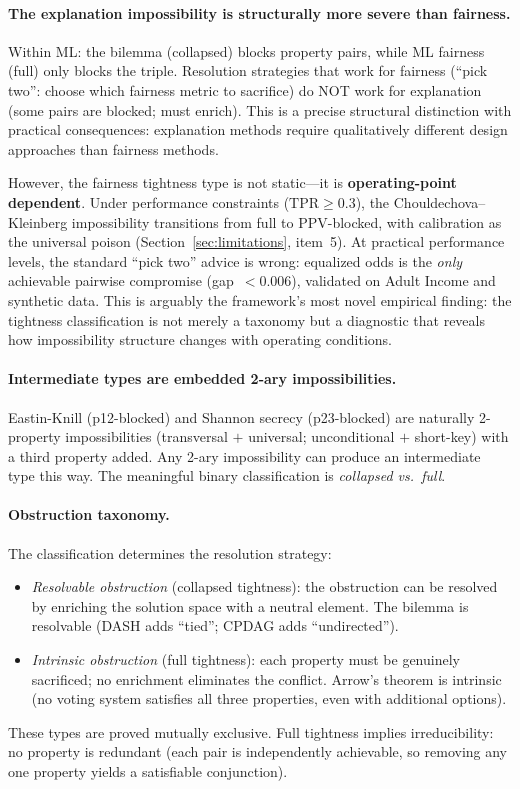 \documentclass[11pt,a4paper]{article}
\begin{document}
\paragraph{The explanation impossibility is structurally more severe than fairness.}
Within ML: the bilemma (collapsed) blocks property pairs, while ML fairness (full) only blocks the triple.  Resolution strategies that work for fairness (``pick two'': choose which fairness metric to sacrifice) do NOT work for explanation (some pairs are blocked; must enrich).  This is a precise structural distinction with practical consequences: explanation methods require qualitatively different design approaches than fairness methods.

However, the fairness tightness type is not static---it is
\textbf{operating-point dependent}.  Under performance constraints
($\mathrm{TPR} \geq 0.3$), the Chouldechova--Kleinberg impossibility
transitions from full to PPV-blocked, with calibration as the universal
poison (Section~\ref{sec:limitations}, item~5).  At practical performance
levels, the standard ``pick two'' advice is wrong: equalized odds is the
\emph{only} achievable pairwise compromise (gap~$< 0.006$), validated on
Adult Income and synthetic data.  This is arguably the framework's most
novel empirical finding: the tightness classification is not merely a
taxonomy but a diagnostic that reveals how impossibility structure changes
with operating conditions.

\paragraph{Intermediate types are embedded 2-ary impossibilities.}
Eastin-Knill (p12-blocked) and Shannon secrecy (p23-blocked) are naturally 2-property impossibilities (transversal $+$ universal; unconditional $+$ short-key) with a third property added.  Any 2-ary impossibility can produce an intermediate type this way.  The meaningful binary classification is \emph{collapsed vs.\ full}.

\paragraph{Obstruction taxonomy.}
The classification determines the resolution strategy:
\begin{itemize}
  \item \emph{Resolvable obstruction} (collapsed tightness): the obstruction can be resolved by enriching the solution space with a neutral element.  The bilemma is resolvable (DASH adds ``tied''; CPDAG adds ``undirected'').
  \item \emph{Intrinsic obstruction} (full tightness): each property must be genuinely sacrificed; no enrichment eliminates the conflict.  Arrow's theorem is intrinsic (no voting system satisfies all three properties, even with additional options).
\end{itemize}
These types are proved mutually exclusive.  Full tightness implies irreducibility: no property is redundant (each pair is independently achievable, so removing any one property yields a satisfiable conjunction).
\end{document}

